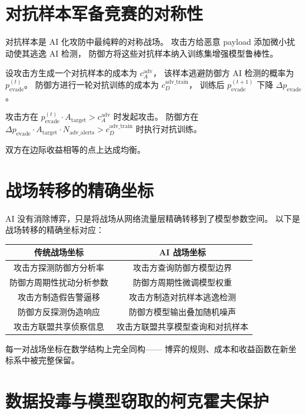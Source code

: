 \documentclass[11pt,a4paper]{article}
\begin{document}
\section{对抗样本军备竞赛的对称性}

对抗样本是 AI 化攻防中最纯粹的对称战场。
攻击方给恶意 payload 添加微小扰动使其逃逸 AI 检测，
防御方将这些对抗样本纳入训练集增强模型鲁棒性。

设攻击方生成一个对抗样本的成本为 \(c_A^{\text{adv}}\)，
该样本逃避防御方 AI 检测的概率为 \(p_{\text{evade}}^{(t)}\)。
防御方进行一轮对抗训练的成本为 \(c_D^{\text{adv\_train}}\)，
训练后 \(p_{\text{evade}}^{(t+1)}\) 下降 \(\Delta p_{\text{evade}}\)。

攻击方在 \(p_{\text{evade}}^{(t)} \cdot A_{\text{target}} > c_A^{\text{adv}}\) 时发起攻击。
防御方在 \(\Delta p_{\text{evade}} \cdot A_{\text{target}} \cdot N_{\text{adv\_alerts}} > c_D^{\text{adv\_train}}\) 时执行对抗训练。

双方在边际收益相等的点上达成均衡。

\section{战场转移的精确坐标}

AI 没有消除博弈，只是将战场从网络流量层精确转移到了模型参数空间。
以下是战场转移的精确坐标对应：

\begin{center}
\begin{tabular}{c|c}
\toprule
\textbf{传统战场坐标} & \textbf{AI 战场坐标} \\
\midrule
攻击方探测防御方分析率 & 攻击方查询防御方模型边界 \\
防御方周期性扰动分析参数 & 防御方周期性微调模型权重 \\
攻击方制造假告警逼移 & 攻击方制造对抗样本逃逸检测 \\
防御方反探测伪造响应 & 防御方模型输出叠加随机噪声 \\
攻击方联盟共享侦察信息 & 攻击方联盟共享模型查询和对抗样本 \\
\bottomrule
\end{tabular}
\end{center}

每一对战场坐标在数学结构上完全同构——
博弈的规则、成本和收益函数在新坐标系中被完整保留。

\section{数据投毒与模型窃取的柯克霍夫保护}
\end{document}
